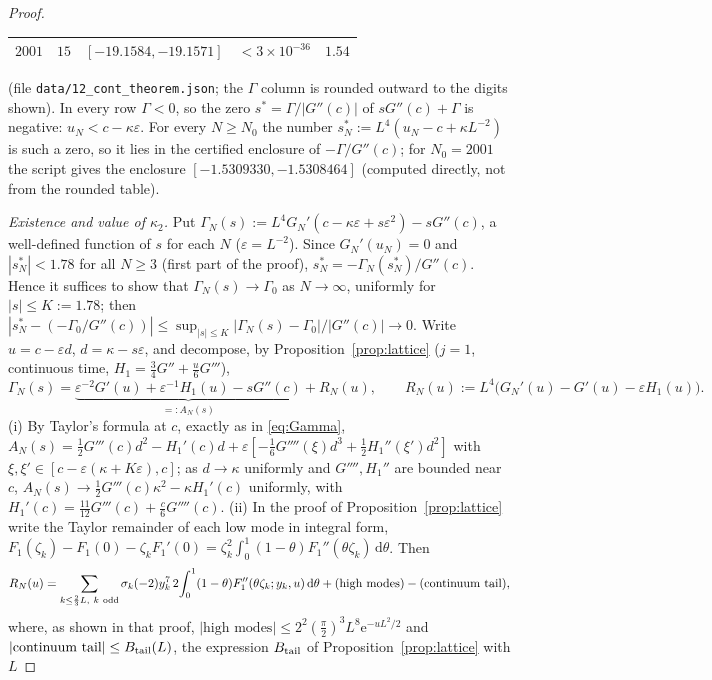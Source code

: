 \documentclass[11pt,a4paper]{article}
\theoremstyle{definition}
\theoremstyle{remark}
\newcommand{\ee}{\mathrm{e}}
\newcommand{\dd}{\mathrm{d}}
\begin{document}
\begin{proof}
\begin{center}
\begin{tabular}{rrlll}
$2001$ & $15$ & $[-19.1584,-19.1571]$ & $<3\times10^{-36}$ & $1.54$\\
\bottomrule
\end{tabular}
\end{center}
(file \texttt{data/12\_cont\_theorem.json}; the $\Gamma$ column is rounded outward to the digits shown). %
In every row $\Gamma<0$, so the zero $s^*=\Gamma/|G''(c)|$ of
$sG''(c)+\Gamma$ is negative: $u_N<c-\kappa\varepsilon$. For every $N\ge N_0$ the number
$s_N^*:=L^4(u_N-c+\kappa L^{-2})$ is such a zero, so it lies in the certified enclosure of $-\Gamma/G''(c)$; for
$N_0=2001$ the script gives the enclosure $[-1.5309330,-1.5308464]$ (computed directly, not from the rounded table).

\emph{Existence and value of $\kappa_2$.} Put $\Gamma_N(s):=L^4G_N'(c-\kappa\varepsilon+s\varepsilon^2)-sG''(c)$, a
well-defined function of $s$ for each $N$ ($\varepsilon=L^{-2}$). Since $G_N'(u_N)=0$ and $|s^*_N|<1.78$ for all $N\ge3$
(first part of the proof), $s^*_N=-\Gamma_N(s^*_N)/G''(c)$. Hence it suffices to show that $\Gamma_N(s)\to\Gamma_0$ as
$N\to\infty$, uniformly for $|s|\le K:=1.78$; then $|s^*_N-(-\Gamma_0/G''(c))|\le\sup_{|s|\le K}|\Gamma_N(s)-\Gamma_0|/|G''(c)|\to0$.
Write $u=c-\varepsilon d$, $d=\kappa-s\varepsilon$, and decompose, by Proposition~\ref{prop:lattice} ($j=1$, continuous
time, $H_1=\frac34G''+\frac u6G'''$),
\[
  \Gamma_N(s)=\underbrace{\varepsilon^{-2}G'(u)+\varepsilon^{-1}H_1(u)-sG''(c)}_{=:A_N(s)}+R_N(u),\qquad
  R_N(u):=L^4\bigl(G_N'(u)-G'(u)-\varepsilon H_1(u)\bigr).
\]
(i) By Taylor's formula at $c$, exactly as in \eqref{eq:Gamma},
$A_N(s)=\frac12G'''(c)d^2-H_1'(c)d+\varepsilon[-\frac16G''''(\xi)d^3+\frac12H_1''(\xi')d^2]$ with $\xi,\xi'\in[c-\varepsilon(\kappa+K\varepsilon),c]$;
as $d\to\kappa$ uniformly and $G'''',H_1''$ are bounded near $c$, $A_N(s)\to\frac12G'''(c)\kappa^2-\kappa H_1'(c)$
uniformly, with $H_1'(c)=\frac{11}{12}G'''(c)+\frac c6G''''(c)$.
(ii) In the proof of Proposition~\ref{prop:lattice} write the Taylor remainder of each low mode in integral form,
$F_1(\zeta_k)-F_1(0)-\zeta_kF_1'(0)=\zeta_k^2\int_0^1(1-\theta)F_1''(\theta\zeta_k)\,\dd\theta$. Then
\[
 R_N(u)=\sum_{k\le\frac23L,\ k\ \rm odd}\sigma_k(-2)y_k^7\,2\!\int_0^1(1-\theta)F_1''(\theta\zeta_k;y_k,u)\,\dd\theta
  +\text{(high modes)}-\text{(continuum tail)},
\]
where, as shown in that proof, $|\text{high modes}|\le2^2(\frac\pi2)^3L^8\ee^{-uL^2/2}$ and
$|\text{continuum tail}|\le B_{\rm tail}(L)$, the expression $B_{\rm tail}$ of Proposition~\ref{prop:lattice} with $L$

\end{proof}
\end{document}
